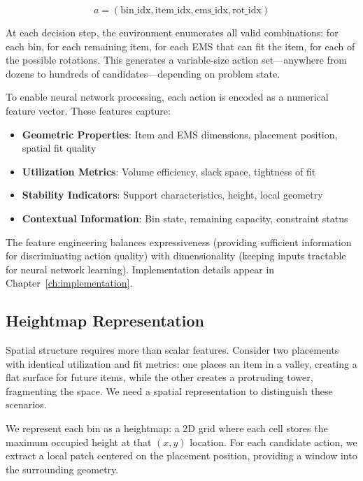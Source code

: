 \begin{equation}
a = (\text{bin\_idx}, \text{item\_idx}, \text{ems\_idx}, \text{rot\_idx})
\end{equation}

At each decision step, the environment enumerates all valid combinations: for each bin, for each remaining item, for each EMS that can fit the item, for each of the possible rotations. This generates a variable-size action set—anywhere from dozens to hundreds of candidates—depending on problem state.

To enable neural network processing, each action is encoded as a numerical feature vector. These features capture:
\begin{itemize}
    \item \textbf{Geometric Properties}: Item and EMS dimensions, placement position, spatial fit quality
    \item \textbf{Utilization Metrics}: Volume efficiency, slack space, tightness of fit
    \item \textbf{Stability Indicators}: Support characteristics, height, local geometry
    \item \textbf{Contextual Information}: Bin state, remaining capacity, constraint status
\end{itemize}

The feature engineering balances expressiveness (providing sufficient information for discriminating action quality) with dimensionality (keeping inputs tractable for neural network learning). Implementation details appear in Chapter~\ref{ch:implementation}.

\subsection{Heightmap Representation}

Spatial structure requires more than scalar features. Consider two placements with identical utilization and fit metrics: one places an item in a valley, creating a flat surface for future items, while the other creates a protruding tower, fragmenting the space. We need a spatial representation to distinguish these scenarios.

We represent each bin as a heightmap: a 2D grid where each cell stores the maximum occupied height at that $(x, y)$ location. For each candidate action, we extract a local patch centered on the placement position, providing a window into the surrounding geometry.


